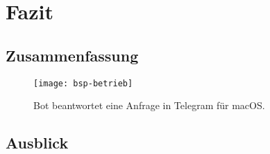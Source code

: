 \chapter{Fazit}

\section{Zusammenfassung}

\begin{figure}[h!]
\centering
\texttt{[image: bsp-betrieb]}
\caption{Bot beantwortet eine Anfrage in Telegram für macOS.}
\end{figure}

\section{Ausblick}

